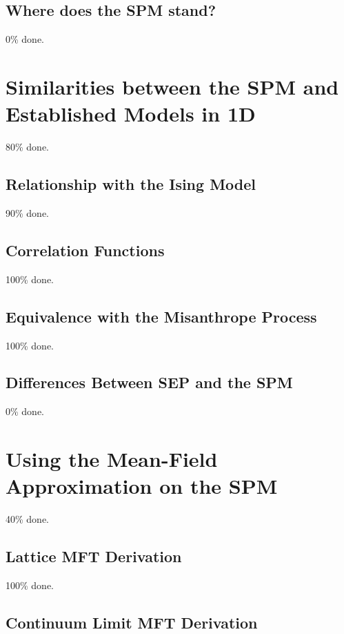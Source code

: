 \subsection{Where does the SPM stand?}

0\% done.

\section{Similarities between the SPM and Established Models in 1D}

80\% done.


\subsection{Relationship with the Ising Model}

90\% done.


\subsection{Correlation Functions}

100\% done.

\subsection{Equivalence with the Misanthrope Process}

100\% done.

\subsection{Differences Between SEP and the SPM}

0\% done.

\section{Using the Mean-Field Approximation on the SPM}

40\% done.


\subsection{Lattice MFT Derivation}

100\% done.

\subsection{Continuum Limit MFT Derivation}

